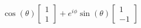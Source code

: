 \documentclass[preview]{standalone}
\begin{document}
\begin{center}
$\cos(\theta) \begin{bmatrix} 1 \\ 1\end{bmatrix} + e^{i\phi}\sin(\theta) \begin{bmatrix} 1 \\ -1\end{bmatrix}$
\end{center}
\end{document}
